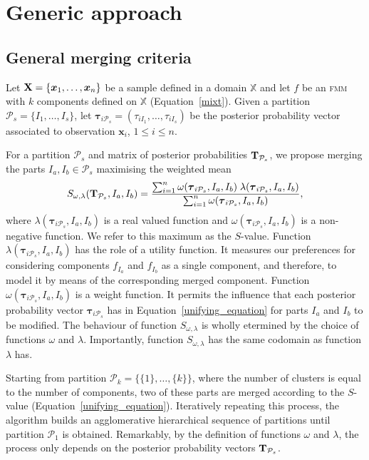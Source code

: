 \documentclass[submit]{smj}
\theoremstyle{definition}
\newcommand{\m}[1]{\boldsymbol{#1}}
\newcommand{\fmm}{\textsc{fmm}\xspace}
\begin{document}
\section{Generic approach}\label{generic_merging}

\subsection{General merging criteria}\label{merging_criteria}

Let $\text{\textbf{X}} = \{\m x_1,\dots,\m x_n \}$ be a sample defined in  a domain $\mathbb{X}$ and let $f$ be an \fmm with $k$ components defined on $\mathbb{X}$ (Equation~\ref{mixt}). Given a partition $\mathcal{P}_s = \{I_1, \dots, I_s\}$, let $\m\tau_{i \mathcal{P}_s}= \left( \tau_{i I_1} , \dots, \tau_{i I_s}  \right)$ be the posterior probability vector associated to observation $\m x_i$, $1\leq i \leq n $.

For a partition $\mathcal{P}_s$  and matrix of posterior probabilities $\text{\textbf{T}}_{\mathcal{P}_s}$, we propose merging the parts $I_a, I_b \in \mathcal{P}_s$ maximising the weighted mean
\begin{equation}\label{unifying_equation}
S_{\omega, \lambda}( \text{\textbf{T}}_{\mathcal{P}_s},  I_a,  I_b) = \frac{\sum_{i=1}^n \omega(\m\tau_{i \mathcal{P}_s}, I_a, I_b) \; \lambda(\m\tau_{i \mathcal{P}_s}, I_a, I_b)}{\sum_{i=1}^n \omega(\m\tau_{i \mathcal{P}_s}, I_a, I_b) },
\end{equation}
where $\lambda(\m\tau_{i \mathcal{P}_s}, I_a, I_b)$ is a real valued function and $\omega(\m\tau_{i \mathcal{P}_s}, I_a, I_b)$ is a non-negative function. We refer to this maximum as the $S$-value. Function $\lambda(\m\tau_{i \mathcal{P}_s},  I_a,  I_b)$ has the role of a utility function. It measures our preferences for considering components $f_{I_a}$ and $f_{I_b}$ as a single component, and therefore, to model it by means of the corresponding merged component. Function $\omega(\m\tau_{i \mathcal{P}_s},  I_a,  I_b)$ is a weight function. It permits the influence that each posterior probability vector $\m\tau_{i \mathcal{P}_s}$ has in Equation~\ref{unifying_equation} for parts $I_a$ and $I_b$ to be modified. The behaviour of function $S_{\omega, \lambda}$ is wholly etermined by the choice of functions $\omega$ and $\lambda$. Importantly, function $S_{\omega, \lambda}$ has the same codomain as function $\lambda$ has.

Starting from partition $\mathcal{P}_k = \{ \{1\}, \dots, \{k\} \}$, where the number of clusters is equal to the number of components, two of these parts are merged according to the $S$-value (Equation~\ref{unifying_equation}). Iteratively repeating this process, the algorithm builds an agglomerative hierarchical sequence of partitions until partition $\mathcal{P}_1$ is obtained. Remarkably, by the definition of functions $\omega$ and $\lambda$, the process only depends on the posterior probability vectors $\text{\textbf{T}}_{\mathcal{P}_s}$.
\end{document}
